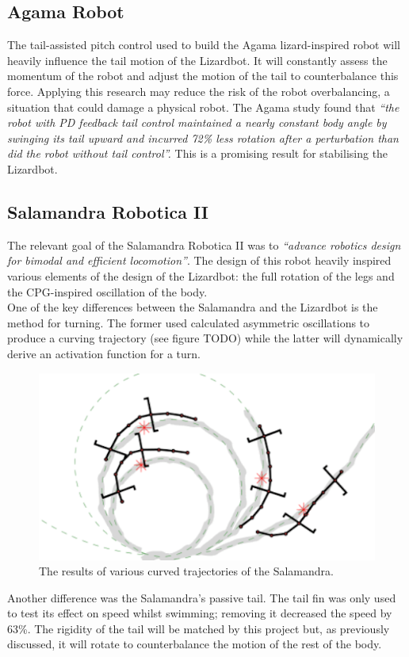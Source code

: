\documentclass{article}
\begin{document}
\subsection{Agama Robot}
The tail-assisted pitch control used to build the Agama lizard-inspired robot will heavily influence the tail motion of the Lizardbot.  It will constantly assess the momentum of the robot and adjust the motion of the tail to counterbalance this force. Applying this research may reduce the risk of the robot overbalancing, a situation that could damage a physical robot. The Agama study found that \textit{“the robot with PD feedback tail control maintained a nearly constant body angle by swinging its tail upward and incurred 72\% less rotation after a perturbation than did the robot without tail control”.} This is a promising result for stabilising the Lizardbot.

\subsection{Salamandra Robotica II}
The relevant goal of the Salamandra Robotica II  was to \textit{“advance robotics design for bimodal and efficient locomotion”}. The design of this robot heavily inspired various elements of the design of the Lizardbot: the full rotation of the legs and the CPG-inspired oscillation of the body. \\
One of the key differences between the Salamandra and the Lizardbot is the method for turning. The former used calculated asymmetric oscillations to produce a curving trajectory (see figure TODO) while the latter will dynamically derive an activation function for a turn. \\
\begin{figure}[H]
\centering
\includegraphics[scale=0.7]{salamandraTurning}
\caption{The results of various curved trajectories of the Salamandra. \citep{salamandra}}
\end{figure}
Another difference was the Salamandra’s passive tail. The tail fin was only used to test its effect on speed whilst swimming; removing it decreased the speed by 63\%. The rigidity of the tail will be matched by this project but, as previously discussed, it will rotate to counterbalance the motion of the rest of the body.
\end{document}
